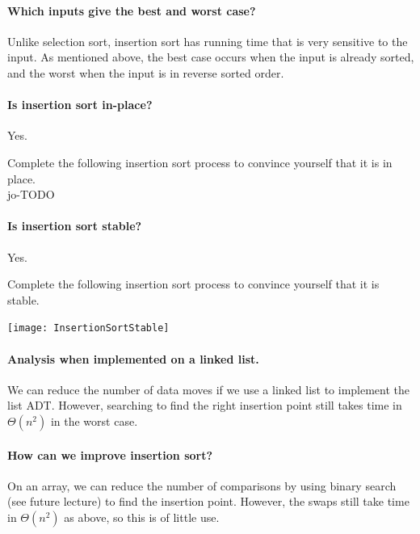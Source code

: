\paragraph{Which inputs give the best and worst case?}
Unlike selection sort, insertion sort has running time that is very sensitive to the input. 
As mentioned above, the best case occurs when the input is already sorted, and the worst when the input is in reverse sorted order.

\paragraph{Is insertion sort in-place?}
Yes. 
\begin{Boxample}[0]
Complete the following insertion sort process to convince yourself that it is in place.\\
jo-TODO
\end{Boxample}


\paragraph{Is insertion sort stable?}
Yes.
\begin{Boxample}[0]
Complete the following insertion sort process to convince yourself that it is stable.
\begin{center}
\texttt{[image: InsertionSortStable]} 
\end{center}
\end{Boxample}

\paragraph{Analysis when implemented on a linked list.}
We can reduce the number of data moves if we use a linked list to implement 
the list ADT. However, searching to find the right insertion point still takes time in 
$\Theta(n^2)$ in the worst case.

\paragraph{How can we improve insertion sort?}
On an array, we can reduce the number of comparisons by using binary search (see future lecture) to find 
the insertion point. However, the swaps still take time in $\Theta(n^2)$ as above, so this is of little use.

